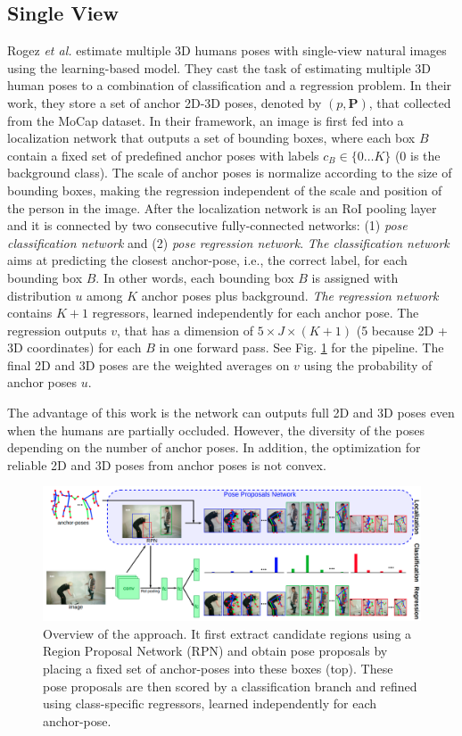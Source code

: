 \subsection{Single View}
 Rogez \textit{et al.} \cite{LCR2019} estimate multiple 3D humans poses with single-view natural images using the learning-based model. They cast the task of estimating multiple 3D human poses to a combination of classification and a regression problem. In their work, they store a set of anchor 2D-3D poses, denoted by $(\mathit{p}, \mathbf{P})$, that collected from the MoCap dataset. In their framework, an image is first fed into a localization network that outputs a set of bounding boxes, where each box $\mathit{B}$ contain a fixed set of predefined anchor poses with labels $\mathit{c_B} \in \{0 \dots K\}$ (0 is the background class). The scale of anchor poses is normalize according to the size of bounding boxes, making the regression independent of the scale and position of the person in the image. After the localization network is an RoI pooling layer and it is connected by two consecutive fully-connected networks: (1) \textit{pose classification network} and (2) \textit{pose regression network}. \textit{The classification network} aims at predicting the closest anchor-pose, i.e., the correct label, for each bounding box $\mathit{B}$. In other words, each bounding box $\mathit{B}$ is assigned with distribution $\mathit{u}$ among $\mathit{K}$ anchor poses plus background. \textit{The regression network} contains $\mathit{K+1}$ regressors, learned independently for each anchor pose. The regression outputs $\mathit{v}$, that has a dimension of $5 \times J \times (K+1)$ (5 because 2D + 3D coordinates) for each $\mathit{B}$ in one forward pass. See Fig. \ref{fig:ch3-overview-lcn} for the pipeline. The final 2D and 3D poses are the weighted averages on $\mathit{v}$ using the probability of anchor poses $\mathit{u}$.
 
 The advantage of this work is the network can outputs full 2D and 3D poses even when the humans are partially occluded. However, the diversity of the poses depending on the number of anchor poses. In addition, the optimization for reliable 2D and 3D poses from anchor poses is not convex.
 \begin{figure}
 	\centering
 	\includegraphics[width=1.0\columnwidth]{figures/ch3/overview-lcn.png}
 	\caption{Overview of the \cite{LCR2019} approach. It first extract candidate regions using a Region
 		Proposal Network (RPN) and obtain pose proposals by placing a fixed set of anchor-poses into these boxes (top). These pose proposals are then scored by a classification branch and refined using class-specific regressors, learned independently for each anchor-pose.} 
 	\label{fig:ch3-overview-lcn}
 \end{figure}
